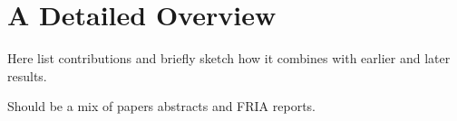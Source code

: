 \chapter{A Detailed Overview}

Here list contributions and briefly sketch how it combines with earlier and
later results.

Should be a mix of papers abstracts and FRIA reports.
